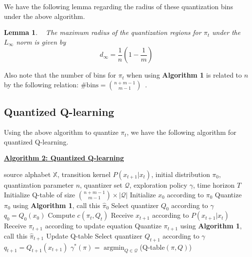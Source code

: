 \documentclass[conference, draftcls, onecolumn]{IEEEtran}
\newtheorem{lemma}{Lemma}
\DeclareMathOperator*{\argmin}{argmin}
\begin{document}
We have the following lemma regarding the radius of these quantization bins under the above algorithm.

\begin{lemma}\label{lemma:radius}~\cite[Proposition 2]{Reznik}
    The maximum radius of the quantization regions for \(\pi_t\) under the \( L_{\infty} \) norm is given by
    \[ d_{\infty} = \frac{1}{n}(1-\frac{1}{m}) \]
\end{lemma}

Also note that the number of bins for \( \pi_t \) when using \textbf{Algorithm 1} is related to \( n \) by the following relation: \( \text{\# bins} = {{n+m-1} \choose {m-1}} \)~\cite{Reznik}.

\subsection{Quantized Q-learning}\label{algorithm2}
Using the above algorithm to quantize \( \pi_t \), we have the following algorithm for quantized Q-learning.

\vspace{1em}

\noindent \underline{\textbf{Algorithm 2: Quantized Q-learning}}\label{algorithm:2}

\begin{algorithmic}[1]
    \REQUIRE source alphabet \(\mathbb{X}\), transition kernel \(P(x_{t+1} | x_t)\), initial distribution \(\pi_0\), quantization parameter \(n\), quantizer set \(\mathcal{Q}\), exploration policy \(\gamma\), time horizon \(T\)
    \STATE Initialize Q-table of size \( {{n+m-1} \choose {m-1}} \times |\mathcal{Q}| \)
    \STATE Initialize \( x_0 \) according to \( \pi_0 \)
    \STATE Quantize \( \pi_0 \) using \textbf{Algorithm 1}, call this \( \hat{\pi}_0 \)
    \STATE Select quantizer \( Q_0 \) according to \( \gamma \)
    \STATE \( q_0 = Q_0(x_0) \)
    \STATE Compute \(c(\pi_t, Q_t)\) 
    \STATE Receive \( x_{t+1} \) according to \( P(x_{t+1} | x_t) \)
    \STATE Receive \( \pi_{t+1} \) according to update equation 
    \STATE Quantize \( \pi_{t+1} \) using \textbf{Algorithm 1}, call this \( \hat{\pi}_{t+1} \)
    \STATE Update Q-table 
    \STATE Select quantizer \( Q_{t+1} \) according to \( \gamma \)
    \STATE \( q_{t+1} = Q_{t+1}(x_{t+1}) \)
    \ENDFOR
    \RETURN \(\gamma^*(\pi) = \argmin_{Q \in \mathcal{Q}}\)(Q-table\((\pi,Q)\))
\end{algorithmic}
\end{document}
